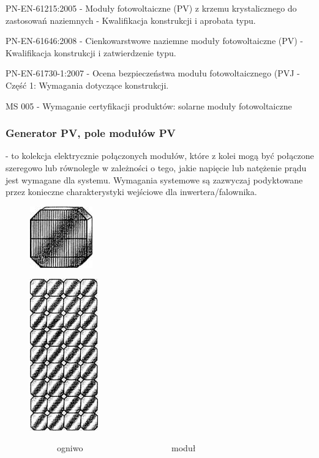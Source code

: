 \documentclass[12pt,a4paper]{article}
\begin{document}
PN-EN-61215:2005 - Moduły fotowoltaiczne (PV) z krzemu krystalicznego do 
zastosowań naziemnych - Kwalifikacja konstrukcji i aprobata typu. 

PN-EN-61646:2008 - Cienkowarstwowe naziemne moduły fotowoltaiczne (PV) - 
Kwalifikacja konstrukcji i zatwierdzenie typu. 

PN-EN-61730-1:2007 - Ocena bezpieczeństwa modułu fotowoltaicznego (PVJ - 
Część 1: Wymagania dotyczące konstrukcji. 

MS 005 - Wymaganie certyfikacji produktów: solarne moduły fotowoltaiczne 

\subsubsection{Generator PV, pole modułów PV} - to kolekcja elektrycznie 
połączonych modułów, które z kolei mogą być połączone szeregowo lub 
równolegle w zależności o tego, jakie napięcie lub natężenie prądu jest 
wymagane dla systemu. Wymagania systemowe są zazwyczaj podyktowane przez 
konieczne charakterystyki wejściowe dla inwertera/falownika. 

\begin{figure}[h]
\centering
\includegraphics[natwidth=2.72cm,natheight=2.65cm]{media/image6.jpg}
\end{figure}
\begin{figure}[h]
\centering
\includegraphics[natwidth=2.96cm,natheight=6.58cm]{media/image7.jpg}
\end{figure}
 \ \ \ \ \ \ \ \ \ \ \ \ ogniwo \ \ \ \ \ \ \ \ \ \ \ \ \ \ \ \ \ \ \ \ 
moduł 
\end{document}
